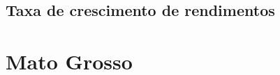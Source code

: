 \documentclass[8pt]{beamer}
\begin{document}
\subsection{Taxa de crescimento de rendimentos}

\begin{frame}
\textit{\hyperlink{indice_principal_amz_jovem}{}}

\end{frame}

\begin{frame}
\textit{\hyperlink{indice_principal_amz_jovem}{}}

\end{frame}

\begin{frame}
\textit{\hyperlink{indice_principal_amz_jovem}{}}

\end{frame}

\section{Mato Grosso}
\end{document}
